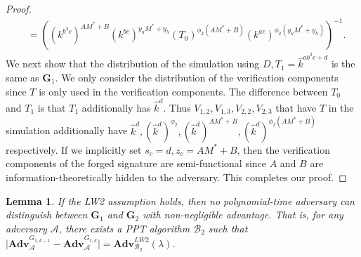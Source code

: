 \documentclass[11pt,letterpaper]{article}
\newtheorem{lemma}[theorem]{Lemma}
\newcommand{\Adv}{\textbf{Adv}}
\newcommand{\mc}[1]{\mathcal{#1}}
\newcommand{\tb}[1]{\textbf{#1}}
\begin{document}
\begin{proof}
\begin{align*}
            &= ((k^{b^3 c})^{A M^* + B} (k^{bc})^{y_u M^* + y_h}
               (T_0)^{\phi_2 (A M^* + B)} (k^{ac})^{\phi_2 (y_u M^* + y_h)})^{-1}.
    \end{align*}
We next show that the distribution of the simulation using $D, T_1 =
\hat{k}^{ab^2c + d}$ is the same as $\tb{G}_1$. We only consider the
distribution of the verification components since $T$ is only used in the
verification components. The difference between $T_0$ and $T_1$ is that $T_1$
additionally has $\hat{k}^{d}$. Thus $V_{1,2}, V_{1,3}, V_{2,2}, V_{2,3}$
that have $T$ in the simulation additionally have $\hat{k}^{d},
(\hat{k}^{d})^{\phi_2}, (\hat{k}^{d})^{A M^* + B}, (\hat{k}^{d})^{\phi_2 (A
M^* + B)}$ respectively. If we implicitly set $s_c = d, z_c = A M^* + B$,
then the verification components of the forged signature are semi-functional
since $A$ and $B$ are information-theoretically hidden to the adversary.
This completes our proof.
\end{proof}

\begin{lemma} \label{lem:pks2-prime-2}
If the LW2 assumption holds, then no polynomial-time adversary can
distinguish between $\tb{G}_1$ and $\tb{G}_2$ with non-negligible advantage.
That is, for any adversary $\mc{A}$, there exists a PPT algorithm $\mc{B}_2$
such that
    $\big| \Adv_{\mc{A}}^{G_{1,k-1}} - \Adv_{\mc{A}}^{G_{1,k}} \big|
    = \Adv_{\mc{B}_2}^{LW2}(\lambda)$.
\end{lemma}
\end{document}
